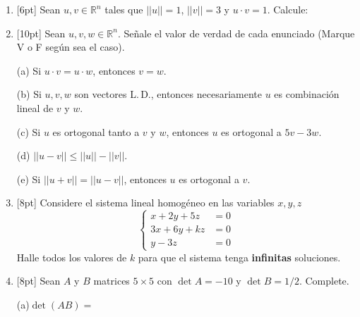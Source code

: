 \documentclass[11pt]{article}
\newcommand{\vf}{\fbox{V}\ \fbox{F}}
\begin{document}
\begin{enumerate}
\item{}[6pt] Sean $u,v\in\mathbb{R}^n$ tales que $||u||=1$, $||v||=3$ y $u\cdot v=1$. Calcule:

\vspace{4pt}

\item{}[10pt] Sean $u,v,w\in\mathbb{R}^n$. Señale el valor de verdad de cada enunciado (Marque V o F según sea el caso).

\vspace{6pt}
\noindent (a) Si $u\cdot v = u\cdot w$, entonces $v=w$. \hfill\vf

\vspace{6pt}
\noindent (b) Si $u,v,w$ son vectores L.\,D., entonces necesariamente $u$ es combinación lineal de $v$ y $w$. \hfill\vf

\vspace{6pt}
\noindent (c) Si $u$ es ortogonal tanto a $v$ y $w$, entonces $u$ es ortogonal a $5v-3w$. \hfill\vf

\vspace{6pt}
\noindent (d) $||u-v||\leq ||u||-||v||$. \hfill\vf

\vspace{6pt}
\noindent (e) Si $||u+v||=||u-v||$, entonces $u$ es ortogonal a $v$. \hfill\vf

\item{}[8pt] Considere el sistema lineal homogéneo en las variables $x,y,z$
\[
\left\{
\begin{aligned}
x+2y+5z &= 0\\
3x+6y+kz &= 0\\
y-3z &= 0
\end{aligned}
\right.
\]
Halle todos los valores de $k$ para que el sistema tenga \textbf{infinitas} soluciones.

\vspace{4pt}

\item{}[8pt] Sean $A$ y $B$ matrices $5\times 5$ con $\det A = -10$ y $\det B = 1/2$. Complete.

\vspace{6pt}
\noindent
\begin{minipage}[t]{0.46\linewidth}
(a)\quad $\det(AB) = $ \dotfill


\end{minipage}
\end{enumerate}
\end{document}
